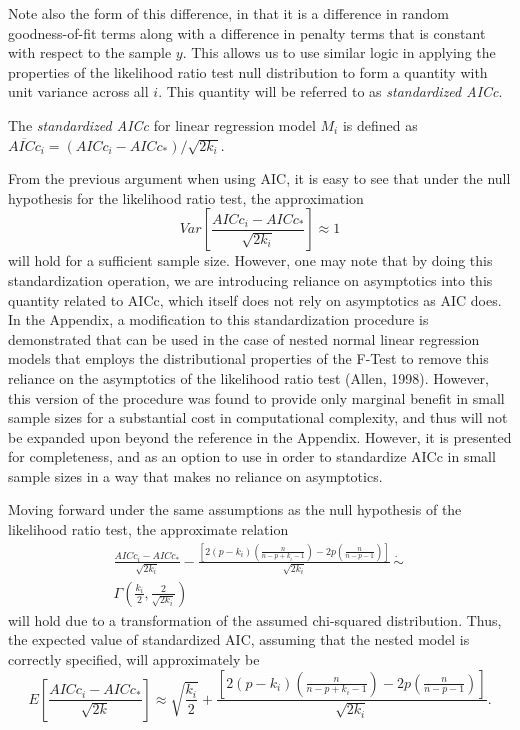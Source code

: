 		Note also the form of this difference, in that it is a difference in random goodness-of-fit terms along with a difference in penalty terms that is constant with respect to the
		sample $y$. This allows us to use similar logic in applying the properties of the likelihood ratio test null distribution to form a quantity with unit variance
		across all $i$. This quantity will be referred to as \textit{standardized AICc}.

		\begin{definition}
			The \textit{standardized AICc} for linear regression model $M_i$ is defined as $\overline{AICc}_i = (AICc_i - AICc_*) / \sqrt{2k_i}$.
		\end{definition}

		From the previous argument when using AIC, it is easy to see that under the null hypothesis for the likelihood ratio test, the approximation
		\begin{equation}
			Var \left[ \frac{AICc_i - AICc_*}{\sqrt{2k_i}} \right] \approx 1 
		\end{equation}
		will hold for a sufficient sample size. However, one may note that by doing this standardization operation, we are introducing reliance on asymptotics into this quantity
		related to AICc, which itself does not rely on asymptotics as AIC does. In the Appendix, a modification to this standardization procedure is demonstrated that can
		be used in the case of nested normal linear regression models that employs the distributional properties of the F-Test to remove this reliance on the asymptotics of the
		likelihood ratio test (Allen, 1998). However, this version of the procedure was found to provide only marginal benefit in small sample sizes for a substantial cost in
		computational complexity, and thus will not be expanded upon beyond the reference in the Appendix. However, it is presented for completeness, and as an option to use
		in order to standardize AICc in small sample sizes in a way that makes no reliance on asymptotics.
		
		Moving forward under the same assumptions as the null hypothesis of the likelihood ratio test, the approximate relation
		\begin{equation}
			\begin{split}
				\frac{AICc_i - AICc_*}{\sqrt{2k_i}} - \frac{\left[ 2(p-k_i) \left( \frac{n}{n-p+k_i-1} \right) - 2p \left( \frac{n}{n-p-1} \right) \right]}{\sqrt{2k_i}} \, \dot\sim \, \\ 
				\Gamma \left( \frac{k_i}{2}, \frac{2}{\sqrt{2k_i}} \right)
			\end{split}
		\end{equation}
		will hold due to a transformation of the assumed chi-squared distribution. Thus, the expected value of standardized AIC, assuming
		that the nested model is correctly specified, will approximately be
		\begin{equation}
			E \left[ \frac{AICc_i - AICc_*}{\sqrt{2k}} \right] \approx \sqrt{\frac{k_i}{2}} + \frac{\left[ 2(p-k_i) \left( \frac{n}{n-p+k_i-1} \right) - 2p \left( \frac{n}{n-p-1} \right) \right]}{\sqrt{2k_i}} .
		\end{equation}

